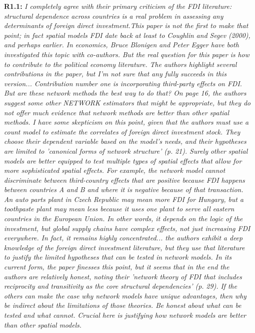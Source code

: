 \documentclass[a4paper,11pt]{texMemo}
\begin{document}
\textbf{R1.1:} \emph{I completely agree with their primary criticism of the FDI literature: structural dependence across countries is a real problem in assessing any determinants of foreign direct investment.This paper is not the first to make that point; in fact spatial models FDI date back at least to Coughlin and Segev (2000), and perhaps earlier. In economics, Bruce Blonigen and Peter Egger have both investigated this topic with co-authors. But the real question for this paper is how to contribute to the political economy literature. The authors highlight several contributions in the paper, but I'm not sure that any fully succeeds in this version... Contribution number one is incorporating third-party effects on FDI. But are these network methods the best way to do that? On page 16, the authors suggest some other NETWORK estimators that might be appropriate, but they do not offer much evidence that network methods are better than other spatial methods. I have some skepticism on this point, given that the authors must use a count model to estimate the correlates of foreign direct investment stock. They choose their dependent variable based on the model's needs, and their hypotheses are limited to 'canonical forms of network structure' (p. 21). Surely other spatial models are better equipped to test multiple types of spatial effects that allow for more sophisticated spatial effects. For example, the network model cannot discriminate between third-country effects that are positive because FDI happens between countries A and B and where it is negative because of that transaction. An auto parts plant in Czech Republic may mean more FDI for Hungary, but a toothpaste plant may mean less because it uses one plant to serve all eastern countries in the European Union. In other words, it depends on the logic of the investment, but global supply chains have complex effects, not just increasing FDI everywhere. In fact, it remains highly concentrated... the authors exhibit a deep knowledge of the foreign direct investment literature, but they use that literature to justify the limited hypotheses that can be tested in network models. In its current form, the paper finesses this point, but it seems that in the end the authors are relatively honest, noting their 'network theory of FDI that includes reciprocity and transitivity as the core structural dependencies' (p. 29). If the others can make the case why network models have unique advantages, then why be indirect about the limitations of those theories. Be honest about what can be tested and what cannot. Crucial here is justifying how network models are better than other spatial models.}\\
\end{document}
